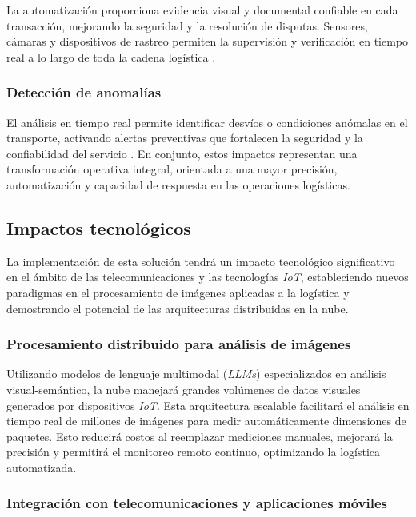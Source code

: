 La automatización proporciona evidencia visual y documental confiable en cada transacción, mejorando la seguridad y la resolución de disputas. Sensores, cámaras y dispositivos de rastreo permiten la supervisión y verificación en tiempo real a lo largo de toda la cadena logística \cite{RedaccinTLW2024}.

\subsubsection{Detección de anomalías}

El análisis en tiempo real permite identificar desvíos o condiciones anómalas en el transporte, activando alertas preventivas que fortalecen la seguridad y la confiabilidad del servicio \cite{RedaccinTLW2024}. En conjunto, estos impactos representan una transformación operativa integral, orientada a una mayor precisión, automatización y capacidad de respuesta en las operaciones logísticas.

\subsection{Impactos tecnológicos}

La implementación de esta solución tendrá un impacto tecnológico significativo en el ámbito de las telecomunicaciones y las tecnologías \textit{IoT}, estableciendo nuevos paradigmas en el procesamiento de imágenes aplicadas a la logística y demostrando el potencial de las arquitecturas distribuidas en la nube.
\subsubsection{Procesamiento distribuido para análisis de imágenes}

Utilizando modelos de lenguaje multimodal (\textit{LLMs}) especializados en análisis visual-semántico, la nube manejará grandes volúmenes de datos visuales generados por dispositivos \textit{IoT}. Esta arquitectura escalable facilitará el análisis en tiempo real de millones de imágenes para medir automáticamente dimensiones de paquetes. Esto reducirá costos al reemplazar mediciones manuales, mejorará la precisión y permitirá el monitoreo remoto continuo, optimizando la logística automatizada.

\subsubsection{Integración con telecomunicaciones y aplicaciones móviles}

